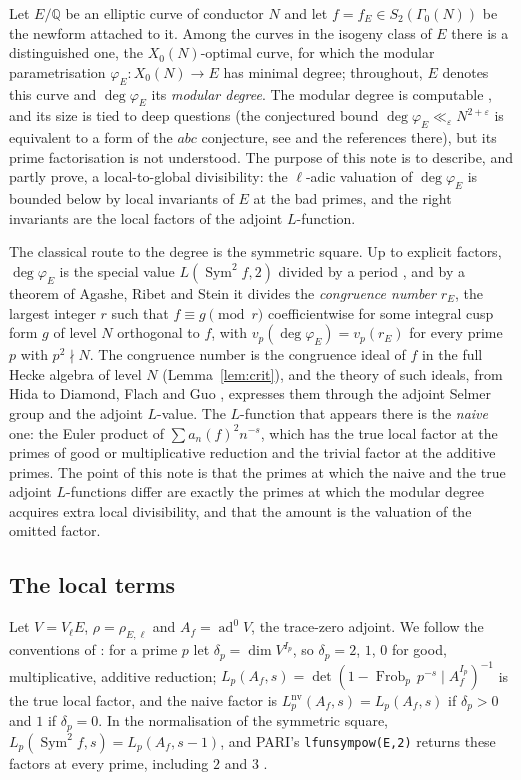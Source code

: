 \documentclass[11pt]{amsart}
\theoremstyle{definition}
\newcommand{\Q}{\mathbb{Q}}
\newcommand{\degphi}{\deg\varphi_E}
\newcommand{\ad}{\operatorname{ad}^0}
\newcommand{\Sym}{\operatorname{Sym}^2}
\newcommand{\nv}{\mathrm{nv}}
\newcommand{\Frob}{\operatorname{Frob}}
\begin{document}
Let $E/\Q$ be an elliptic curve of conductor $N$ and let $f=f_E\in S_2(\Gamma_0(N))$ be the newform attached to it. Among the curves in the isogeny class of $E$ there is a distinguished one, the $X_0(N)$-optimal curve, for which the modular parametrisation $\varphi_E\colon X_0(N)\to E$ has minimal degree; throughout, $E$ denotes this curve and $\degphi$ its \emph{modular degree}. The modular degree is computable \cite{Cremona97,Watkins02}, and its size is tied to deep questions (the conjectured bound $\degphi\ll_\varepsilon N^{2+\varepsilon}$ is equivalent to a form of the $abc$ conjecture, see \cite[\S2]{ARS12} and the references there), but its prime factorisation is not understood. The purpose of this note is to describe, and partly prove, a local-to-global divisibility: the $\ell$-adic valuation of $\degphi$ is bounded below by local invariants of $E$ at the bad primes, and the right invariants are the local factors of the adjoint $L$-function.

The classical route to the degree is the symmetric square. Up to explicit factors, $\degphi$ is the special value $L(\Sym f,2)$ divided by a period \cite{Flach92,Watkins02}, and by a theorem of Agashe, Ribet and Stein \cite[Theorem 2.2]{ARS12} it divides the \emph{congruence number} $r_E$, the largest integer $r$ such that $f\equiv g\pmod r$ coefficientwise for some integral cusp form $g$ of level $N$ orthogonal to $f$, with $v_p(\degphi)=v_p(r_E)$ for every prime $p$ with $p^2\nmid N$. The congruence number is the congruence ideal of $f$ in the full Hecke algebra of level $N$ (Lemma~\ref{lem:crit}), and the theory of such ideals, from Hida \cite{Hida81} to Diamond, Flach and Guo \cite{DFG04}, expresses them through the adjoint Selmer group and the adjoint $L$-value. The $L$-function that appears there is the \emph{naive} one: the Euler product of $\sum a_n(f)^2n^{-s}$, which has the true local factor at the primes of good or multiplicative reduction and the trivial factor at the additive primes. The point of this note is that the primes at which the naive and the true adjoint $L$-functions differ are exactly the primes at which the modular degree acquires extra local divisibility, and that the amount is the valuation of the omitted factor.

\subsection{The local terms}
Let $V=V_\ell E$, $\rho=\rho_{E,\ell}$ and $A_f=\ad V$, the trace-zero adjoint. We follow the conventions of \cite[\S1.7.2]{DFG04}: for a prime $p$ let $\delta_p=\dim V^{I_p}$, so $\delta_p=2$, $1$, $0$ for good, multiplicative, additive reduction; $L_p(A_f,s)=\det(1-\Frob_p\,p^{-s}\mid A_f^{I_p})^{-1}$ is the true local factor, and the naive factor is $L_p^{\nv}(A_f,s)=L_p(A_f,s)$ if $\delta_p>0$ and $1$ if $\delta_p=0$. In the normalisation of the symmetric square, $L_p(\Sym f,s)=L_p(A_f,s-1)$, and PARI's \texttt{lfunsympow(E,2)} returns these factors at every prime, including $2$ and $3$ \cite{PARI}.
\end{document}
